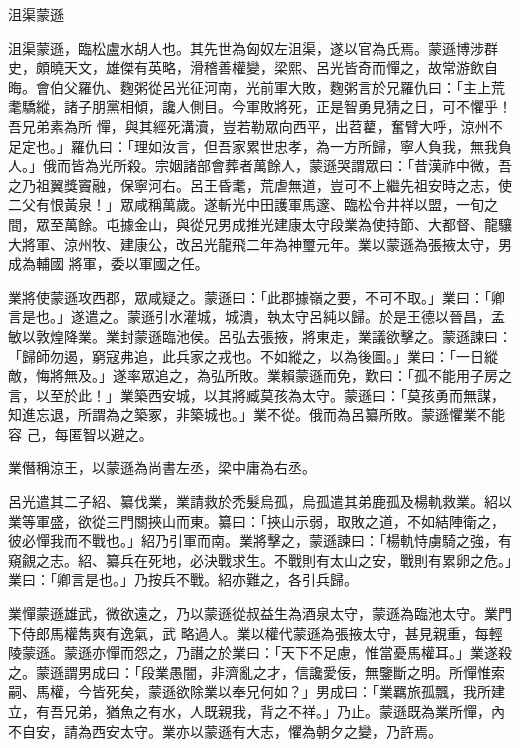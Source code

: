 
\begin{pinyinscope}

 沮渠蒙遜



 沮渠蒙遜，臨松盧水胡人也。其先世為匈奴左沮渠，遂以官為氏焉。蒙遜博涉群史，頗曉天文，雄傑有英略，滑稽善權變，梁熙、呂光皆奇而憚之，故常游飲自晦。會伯父羅仇、麴粥從呂光征河南，光前軍大敗，麴粥言於兄羅仇曰：「主上荒耄驕縱，諸子朋黨相傾，讒人側目。今軍敗將死，正是智勇見猜之日，可不懼乎！吾兄弟素為所
 憚，與其經死溝瀆，豈若勒眾向西平，出苕藋，奮臂大呼，涼州不足定也。」羅仇曰：「理如汝言，但吾家累世忠孝，為一方所歸，寧人負我，無我負人。」俄而皆為光所殺。宗姻諸部會葬者萬餘人，蒙遜哭謂眾曰：「昔漢祚中微，吾之乃祖翼獎竇融，保寧河右。呂王昏耄，荒虐無道，豈可不上繼先祖安時之志，使二父有恨黃泉！」眾咸稱萬歲。遂斬光中田護軍馬邃、臨松令井祥以盟，一旬之間，眾至萬餘。屯據金山，與從兄男成推光建康太守段業為使持節、大都督、龍驤大將軍、涼州牧、建康公，改呂光龍飛二年為神璽元年。業以蒙遜為張掖太守，男成為輔國
 將軍，委以軍國之任。



 業將使蒙遜攻西郡，眾咸疑之。蒙遜曰：「此郡據嶺之要，不可不取。」業曰：「卿言是也。」遂遣之。蒙遜引水灌城，城潰，執太守呂純以歸。於是王德以晉昌，孟敏以敦煌降業。業封蒙遜臨池侯。呂弘去張掖，將東走，業議欲擊之。蒙遜諫曰：「歸師勿遏，窮寇弗追，此兵家之戎也。不如縱之，以為後圖。」業曰：「一日縱敵，悔將無及。」遂率眾追之，為弘所敗。業賴蒙遜而免，歎曰：「孤不能用子房之言，以至於此！」業築西安城，以其將臧莫孩為太守。蒙遜曰：「莫孩勇而無謀，知進忘退，所謂為之築冢，非築城也。」業不從。俄而為呂纂所敗。蒙遜懼業不能容
 己，每匿智以避之。



 業僭稱涼王，以蒙遜為尚書左丞，梁中庸為右丞。



 呂光遣其二子紹、纂伐業，業請救於禿髮烏孤，烏孤遣其弟鹿孤及楊軌救業。紹以業等軍盛，欲從三門關挾山而東。纂曰：「挾山示弱，取敗之道，不如結陣衛之，彼必憚我而不戰也。」紹乃引軍而南。業將擊之，蒙遜諫曰：「楊軌恃虜騎之強，有窺覦之志。紹、纂兵在死地，必決戰求生。不戰則有太山之安，戰則有累卵之危。」業曰：「卿言是也。」乃按兵不戰。紹亦難之，各引兵歸。



 業憚蒙遜雄武，微欲遠之，乃以蒙遜從叔益生為酒泉太守，蒙遜為臨池太守。業門下侍郎馬權雋爽有逸氣，武
 略過人。業以權代蒙遜為張掖太守，甚見親重，每輕陵蒙遜。蒙遜亦憚而怨之，乃譖之於業曰：「天下不足慮，惟當憂馬權耳。」業遂殺之。蒙遜謂男成曰：「段業愚闇，非濟亂之才，信讒愛佞，無鑒斷之明。所憚惟索嗣、馬權，今皆死矣，蒙遜欲除業以奉兄何如？」男成曰：「業羈旅孤飄，我所建立，有吾兄弟，猶魚之有水，人既親我，背之不祥。」乃止。蒙遜既為業所憚，內不自安，請為西安太守。業亦以蒙遜有大志，懼為朝夕之變，乃許焉。




\end{pinyinscope}
